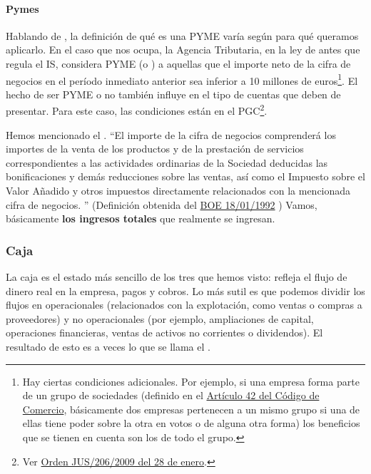 \documentclass[nochap,palatino,shortheader]{apuntes}
\newcommand{\study}[1]{#1} \newcommand{\substudy}[1]{#1}
\begin{document}
\paragraph{Pymes} Hablando de , la definición de qué es una PYME varía según para qué queramos aplicarlo.
En el caso que nos ocupa, la Agencia Tributaria, en la ley de antes que regula el IS, considera PYME (o ) a aquellas que el importe neto de la cifra de negocios en el período inmediato anterior sea inferior a 10 millones de euros\footnote{Hay ciertas condiciones adicionales.
Por ejemplo, si una empresa forma parte de un grupo de sociedades (definido en el \href{https://www.boe.es/buscar/act.php?id=BOE-A-1885-6627&tn=1&vd=&p=20150721}{Artículo 42 del Código de Comercio}, básicamente dos empresas pertenecen a un mismo grupo si una de ellas tiene poder sobre la otra en votos o de alguna otra forma) los beneficios que se tienen en cuenta son los de todo el grupo.}.
El hecho de ser PYME o no también influye en el tipo de cuentas que deben de presentar. Para este caso, las condiciones están en el PGC\footnote{Ver \href{https://www.boe.es/boe/dias/2009/02/10/pdfs/BOE-A-2009-2276.pdf}{Orden JUS/206/2009 del 28 de enero}.}.



Hemos mencionado el . ``El importe de \study{la cifra de negocios} comprenderá los importes de la venta de los productos y de la prestación de servicios correspondientes a las actividades ordinarias de la Sociedad deducidas las bonificaciones y demás reducciones sobre las ventas, así como el Impuesto sobre el Valor Añadido y otros impuestos directamente relacionados con la mencionada cifra de negocios.  '' (Definición obtenida del \href{http://www.minhap.gob.es/Documentacion/Publico/NormativaDoctrina/Contabilidad%20y%20Auditoria%20de%20Empresas/Contabilidad/cifranegocA.pdf}{BOE 18/01/1992}
) Vamos, básicamente \textbf{\study{los ingresos totales}} que realmente se ingresan.

\subsubsection{Caja}

La caja es el estado más sencillo de los tres que hemos visto: refleja el flujo de dinero real en la empresa, pagos y cobros. Lo más sutil es que podemos dividir los flujos en operacionales (relacionados con la explotación, como ventas o compras a proveedores) y no operacionales (por ejemplo, ampliaciones de capital, operaciones financieras, ventas de activos no corrientes o dividendos).
El resultado de esto es a veces lo que se llama el .
\end{document}
